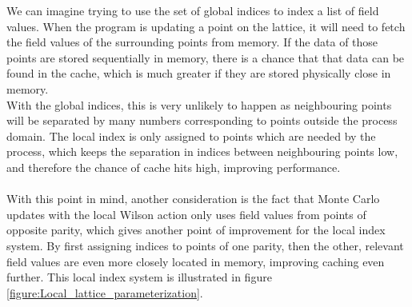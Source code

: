 \documentclass[a4paper,10pt]{article}
\begin{document}
We can imagine trying to use the set of global indices to index a list of field values. When the program is updating a point on the lattice, it will need to fetch the field values of the surrounding points from memory. If the data of those points are stored sequentially in memory, there is a chance that that data can be found in the cache, which is much greater if they are stored physically close in memory.\\With the global indices, this is very unlikely to happen as neighbouring points will be separated by many numbers corresponding to points outside the process domain. The local index is only assigned to points which are needed by the process, which keeps the separation in indices between neighbouring points low, and therefore the chance of cache hits high, improving performance.\\\\With this point in mind, another consideration is the fact that Monte Carlo updates with the local Wilson action only uses field values from points of opposite parity, which gives another point of improvement for the local index system. By first assigning indices to points of one parity, then the other, relevant field values are even more closely located in memory, improving caching even further. This local index system is illustrated in figure \ref{figure:Local_lattice_parameterization}.
\end{document}
